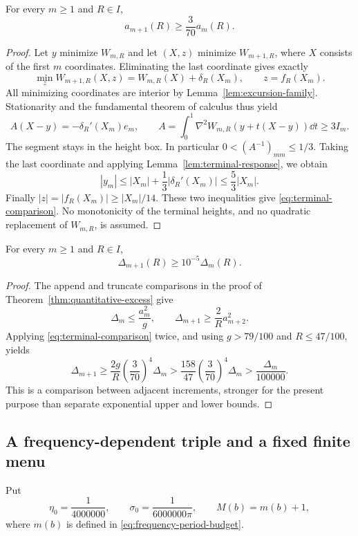 \begin{proposition}
\label{prop:terminal-comparison}
For every $m\ge1$ and $R\in I$,
\begin{equation}\label{eq:terminal-comparison}
 a_{m+1}(R)\ge\frac3{70}a_m(R).
\end{equation}
\end{proposition}
\begin{proof}
Let $y$ minimize $W_{m,R}$ and let $(X,z)$ minimize $W_{m+1,R}$,
where $X$ consists of the first $m$ coordinates. Eliminating the
last coordinate gives exactly
\[
 \min_z W_{m+1,R}(X,z)=W_{m,R}(X)+\delta_R(X_m),
 \qquad z=f_R(X_m).
\]
All minimizing coordinates are interior by
Lemma~\ref{lem:excursion-family}. Stationarity and the fundamental
theorem of calculus thus yield
\[
 A(X-y)=-\delta_R'(X_m)e_m,\qquad
 A=\int_0^1\nabla^2W_{m,R}(y+t(X-y))\dd t\ge3I_m.
\]
The segment stays in the height box. In particular
$0<(A^{-1})_{mm}\le1/3$. Taking the last coordinate and applying
Lemma~\ref{lem:terminal-response}, we obtain
\[
 |y_m|\le |X_m|+\frac13|\delta_R'(X_m)|
             \le\frac53|X_m|.
\]
Finally $|z|=|f_R(X_m)|\ge|X_m|/14$. These two inequalities give
\eqref{eq:terminal-comparison}. No monotonicity of the terminal
heights, and no quadratic replacement of $W_{m,R}$, is assumed.
\end{proof}

\begin{corollary}
\label{cor:increment-ratio}
For every $m\ge1$ and $R\in I$,
\begin{equation}\label{eq:increment-ratio}
 \Delta_{m+1}(R)\ge10^{-5}\Delta_m(R).
\end{equation}
\end{corollary}
\begin{proof}
The append and truncate comparisons in the proof of
Theorem~\ref{thm:quantitative-excess} give
\[
 \Delta_m\le\frac{a_m^2}{g},\qquad
 \Delta_{m+1}\ge\frac2R a_{m+2}^2.
\]
Applying \eqref{eq:terminal-comparison} twice, and using
$g>79/100$ and $R\le47/100$, yields
\[
 \Delta_{m+1}\ge\frac{2g}{R}\left(\frac3{70}\right)^4\Delta_m
 >\frac{158}{47}\left(\frac3{70}\right)^4\Delta_m
 >\frac{\Delta_m}{100000}.
\]
This is a comparison between adjacent increments, stronger for the
present purpose than separate exponential upper and lower bounds.
\end{proof}

\subsection{A frequency-dependent triple and a fixed finite menu}
Put
\begin{equation}\label{eq:uniform-phase-constants}
 \eta_0=\frac1{4000000},\qquad
 \sigma_0=\frac1{6000000\pi},\qquad
 M(b)=m(b)+1,
\end{equation}
where $m(b)$ is defined in \eqref{eq:frequency-period-budget}.

